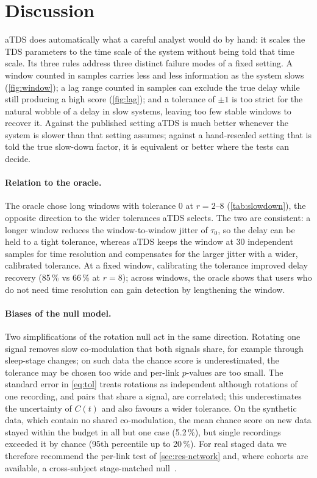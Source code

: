 \documentclass[11pt,a4paper]{article}
\begin{document}
\section{Discussion}
\label{sec:discussion}
aTDS does automatically what a careful analyst would do by hand: it scales the TDS parameters to the time scale of the system without being told that time scale. Its three rules address three distinct failure modes of a fixed setting. A window counted in samples carries less and less information as the system slows (\cref{fig:window}); a lag range counted in samples can exclude the true delay while still producing a high score (\cref{fig:lag}); and a tolerance of $\pm1$ is too strict for the natural wobble of a delay in slow systems, leaving too few stable windows to recover it. Against the published setting aTDS is much better whenever the system is slower than that setting assumes; against a hand-rescaled setting that is told the true slow-down factor, it is equivalent or better where the tests can decide.

\paragraph{Relation to the oracle.} The oracle chose long windows with tolerance 0 at $r = 2$--8 (\cref{tab:slowdown}), the opposite direction to the wider tolerances aTDS selects. The two are consistent: a longer window reduces the window-to-window jitter of $\tau_0$, so the delay can be held to a tight tolerance, whereas aTDS keeps the window at 30 independent samples for time resolution and compensates for the larger jitter with a wider, calibrated tolerance. At a fixed window, calibrating the tolerance improved delay recovery (85\,\% vs 66\,\% at $r = 8$); across windows, the oracle shows that users who do not need time resolution can gain detection by lengthening the window.

\paragraph{Biases of the null model.} Two simplifications of the rotation null act in the same direction. Rotating one signal removes slow co-modulation that both signals share, for example through sleep-stage changes; on such data the chance score is underestimated, the tolerance may be chosen too wide and per-link $p$-values are too small. The standard error in \cref{eq:tol} treats rotations as independent although rotations of one recording, and pairs that share a signal, are correlated; this underestimates the uncertainty of $C(t)$ and also favours a wider tolerance. On the synthetic data, which contain no shared co-modulation, the mean chance score on new data stayed within the budget in all but one case (5.2\,\%), but single recordings exceeded it by chance (95th percentile up to 20\,\%). For real staged data we therefore recommend the per-link test of \cref{sec:res-network} and, where cohorts are available, a cross-subject stage-matched null~\cite{Bashan2012NetworkPhysiology}.
\end{document}
